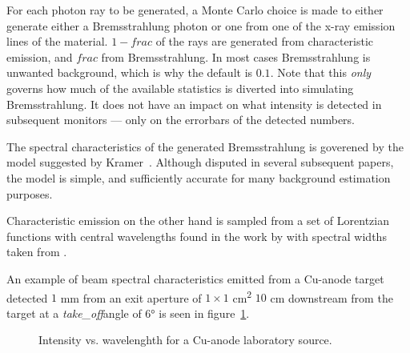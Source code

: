 For each photon ray to be generated, a Monte Carlo choice is made to either
generate either a Bremsstrahlung photon or one from one of the x-ray emission
lines of the material. $1-\mathit{frac}$ of the rays are generated from characteristic
emission, and $\mathit{frac}$ from Bremsstrahlung. In most cases Bremsstrahlung is
unwanted background, which is why the default is $0.1$. Note that this
\emph{only} governs how much of the available statistics is diverted into
simulating Bremsstrahlung. It does not have an impact on what intensity is detected
in subsequent monitors --- only on the errorbars of the detected numbers.

The spectral characteristics of the generated Bremsstrahlung is goverened by
the model suggested by Kramer~\cite{kramers1923}. Although disputed in several
subsequent papers, the model is simple, and sufficiently accurate for many
background estimation purposes.

Characteristic emission on the other hand is sampled from a set of Lorentzian
functions with central wavelengths found in the work by \cite{bearden1967x} with
spectral widths taken from \cite{krause1979natural}.

An example of beam spectral characteristics emitted from a Cu-anode target
detected $1$ mm  from an exit aperture of $1\times 1$ \si{cm\squared} $10$ \si{cm} downstream from the
target at a \textit{take\_off}angle of $6\si{\degree}$ is seen in
figure~\ref{f:source_lab_spectrum}.
\begin{figure}
\label{f:source_lab_spectrum}
\caption{Intensity vs. wavelenghth for a Cu-anode laboratory source.}
\end{figure}
